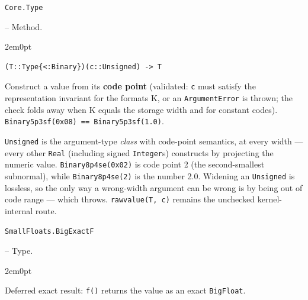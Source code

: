 \par\medskip\noindent\begin{minipage}{\linewidth}
\hypertarget{4674484589655001634}{\texttt{Core.Type}}  -- {Method.}
\nopagebreak
\begin{adjustwidth}{2em}{0pt}


\begin{verbatim}
(T::Type{<:Binary})(c::Unsigned) -> T
\end{verbatim}

Construct a value from its \textbf{code point} (validated: \texttt{c} must satisfy the representation invariant for the format{\textquotesingle}s K, or an \texttt{ArgumentError} is thrown; the check folds away when K equals the storage width and for constant codes). \texttt{Binary5p3sf(\allowbreak{}0x08) == Binary5p3sf(\allowbreak{}1.0)}.

\texttt{Unsigned} is the argument-type \emph{class} with code-point semantics, at every width — every other \texttt{Real} (including signed \texttt{Integer}s) constructs by projecting the numeric value. \texttt{Binary8p4se(0x02)} is code point 2 (the second-smallest subnormal), while \texttt{Binary8p4se(2)} is the number 2.0. Widening an \texttt{Unsigned} is lossless, so the only way a wrong-width argument can be wrong is by being out of code range — which throws. \texttt{rawvalue(T, c)} remains the unchecked kernel-internal route.



\end{adjustwidth}
\end{minipage}
\par\medskip

\par\medskip\noindent\begin{minipage}{\linewidth}
\hypertarget{7842307923234431821}{\texttt{SmallFloats.BigExactF}}  -- {Type.}
\nopagebreak
\begin{adjustwidth}{2em}{0pt}

Deferred exact result: \texttt{f()} returns the value as an exact \texttt{BigFloat}.



\end{adjustwidth}
\end{minipage}
\par\medskip

